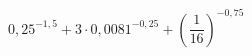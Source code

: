 \begin{ex}[type=calculate]
	\begin{condition}
		\( 0,25^{-1,5}+3\cdot0,0081^{-0,25}+\left( \dfrac{1}{16} \right)^{-0,75} \)
	\end{condition}
\end{ex}